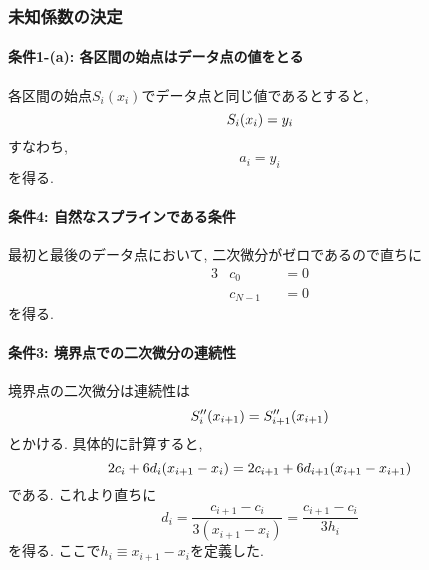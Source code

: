 \subsubsection{未知係数の決定}

\paragraph{条件1-(a): 各区間の始点はデータ点の値をとる}
各区間の始点$S_{i}(x_{i})$でデータ点と同じ値であるとすると, 
\begin{equation}
    S_{i}(x_{i}) = y_{i}
    \notag
\end{equation}
すなわち, 
\begin{equation}
    a_{i} = y_{i}
\end{equation}
を得る.

\paragraph{条件4: 自然なスプラインである条件}
最初と最後のデータ点において, 二次微分がゼロであるので直ちに
\begin{alignat}{3}
    & c_{0}   &&= 0 \\
    & c_{N-1} &&= 0
\end{alignat}
を得る.

\paragraph{条件3: 境界点での二次微分の連続性}
境界点の二次微分は連続性は
\begin{equation}
    S_{i}^{\prime\prime} (x_{i+1})
    =
    S_{i+1}^{\prime\prime} (x_{i+1})
    \notag
\end{equation}
とかける. 具体的に計算すると,
\begin{equation}
    2 c_{i} + 6 d_{i} (x_{i+1} - x_{i})
    =
    2 c_{i+1} + 6 d_{i+1} (x_{i+1} - x_{i+1})
    \notag
\end{equation}
である. これより直ちに
\begin{equation}
    d_{i} = 
    \frac{c_{i+1} - c_{i}}{3(x_{i+1} - x_{i})}
    =
    \frac{c_{i+1} - c_{i}}{3 h_{i}}
\end{equation}
を得る. ここで$h_{i} \equiv x_{i+1} - x_{i}$を定義した.

